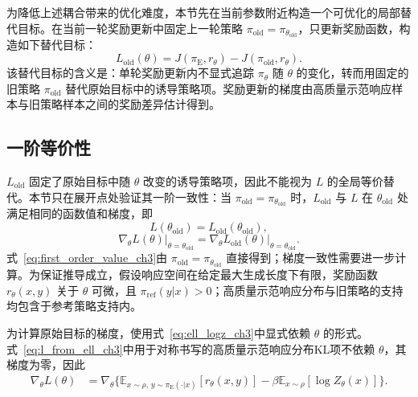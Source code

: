 为降低上述耦合带来的优化难度，本节先在当前参数附近构造一个可优化的局部替代目标。在当前一轮奖励更新中固定上一轮策略 $\pi_{\mathrm{old}}=\pi_{\theta_{\mathrm{old}}}$，只更新奖励函数，构造如下替代目标：
\begin{equation}
    L_{\mathrm{old}}(\theta)=J(\pi_{\mathrm{E}},r_\theta)-J(\pi_{\mathrm{old}},r_\theta).
    \label{eq:surrogate_ch3}
\end{equation}
该替代目标的含义是：单轮奖励更新内不显式追踪 $\pi_\theta$ 随 $\theta$ 的变化，转而用固定的旧策略 $\pi_{\mathrm{old}}$ 替代原始目标中的诱导策略项。奖励更新的梯度由高质量示范响应样本与旧策略样本之间的奖励差异估计得到。

\subsection{一阶等价性}

$L_{\mathrm{old}}$ 固定了原始目标中随 $\theta$ 改变的诱导策略项，因此不能视为 $L$ 的全局等价替代。本节只在展开点处验证其一阶一致性：当 $\pi_{\mathrm{old}}=\pi_{\theta_{\mathrm{old}}}$ 时，$L_{\mathrm{old}}$ 与 $L$ 在 $\theta_{\mathrm{old}}$ 处满足相同的函数值和梯度，即
\begin{equation}
    L(\theta_{\mathrm{old}})=L_{\mathrm{old}}(\theta_{\mathrm{old}}),
    \label{eq:first_order_value_ch3}
\end{equation}
\begin{equation}
    \nabla_\theta L(\theta)\big|_{\theta=\theta_{\mathrm{old}}}
    =\nabla_\theta L_{\mathrm{old}}(\theta)\big|_{\theta=\theta_{\mathrm{old}}}.
    \label{eq:first_order_grad_ch3}
\end{equation}
式~\eqref{eq:first_order_value_ch3}由 $\pi_{\mathrm{old}}=\pi_{\theta_{\mathrm{old}}}$ 直接得到；梯度一致性需要进一步计算。为保证推导成立，假设响应空间在给定最大生成长度下有限，奖励函数 $r_\theta(x,y)$ 关于 $\theta$ 可微，且 $\pi_{\mathrm{ref}}(y|x)>0$；高质量示范响应分布与旧策略的支持均包含于参考策略支持内。

为计算原始目标的梯度，使用式~\eqref{eq:ell_logz_ch3}中显式依赖 $\theta$ 的形式。式~\eqref{eq:l_from_ell_ch3}中用于对称书写的高质量示范响应分布KL项不依赖 $\theta$，其梯度为零，因此
\begin{equation}
\begin{aligned}
    \nabla_\theta L(\theta)
    &=\nabla_\theta\Bigg\{
    \mathbb{E}_{x\sim\rho,\,y\sim\pi_{\mathrm{E}}(\cdot|x)}
    \left[r_\theta(x,y)\right]
    -
    \beta\mathbb{E}_{x\sim\rho}\left[\log Z_\theta(x)\right]
    \Bigg\}.
\end{aligned}
    \label{eq:l_logz_ch3}
\end{equation}

